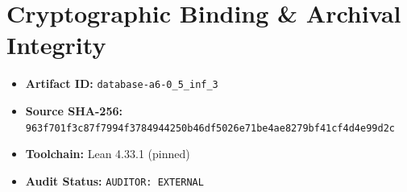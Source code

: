\documentclass[11pt,a4paper]{article}
\begin{document}
\section{Cryptographic Binding & Archival Integrity}
\begin{itemize}
  \item \textbf{Artifact ID:} \texttt{database-a6-0_5_inf_3}
  \item \textbf{Source SHA-256:} \texttt{963f701f3c87f7994f3784944250b46df5026e71be4ae8279bf41cf4d4e99d2c}
  \item \textbf{Toolchain:} Lean 4.33.1 (pinned)
  \item \textbf{Audit Status:} \texttt{AUDITOR: EXTERNAL}
\end{itemize}
\end{document}
